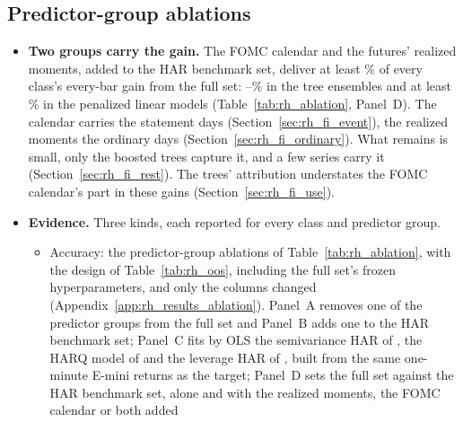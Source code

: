 
\subsection{Predictor-group ablations}
\label{sec:rh_fi}
\label{sec:rh_results_ablation}
\ifdefined\rhfipNOrigins\else\fi
\ifdefined\rhabLgbmFullAllPct\else\fi
\ifdefined\rhcxWMain\else\fi
\ifdefined\rhchNEventDays\else\fi
\ifdefined\rhfaReading\else\fi
\ifdefined\rhbyLXgbReading\else\fi
\ifdefined\rhbyFXgbReading\else\fi
\begin{itemize}
\item \textbf{Two groups carry the gain.} The FOMC calendar and the futures' realized moments, added to the HAR
  benchmark set, deliver at least \rhabBaseShareMin\% of every class's every-bar gain from the full set:
  \rhabBaseShareTreeMin--\rhabBaseShareTreeMax\% in the tree ensembles and at least \rhabBaseShareLinMin\% in the
  penalized linear models (Table~\ref{tab:rh_ablation}, Panel~D). The calendar carries the statement days
  (Section~\ref{sec:rh_fi_event}), the realized moments the ordinary days (Section~\ref{sec:rh_fi_ordinary}). What
  remains is small, only the boosted trees capture it, and a few series carry it (Section~\ref{sec:rh_fi_rest}). The
  trees' attribution understates the FOMC calendar's part in these gains (Section~\ref{sec:rh_fi_use}).
\item \textbf{Evidence.} Three kinds, each reported for every class and predictor group.
  \begin{itemize}
  \item Accuracy: the predictor-group ablations of Table~\ref{tab:rh_ablation}, with the design of
    Table~\ref{tab:rh_oos}, including the full set's frozen hyperparameters, and only the columns changed
    (Appendix~\ref{app:rh_results_ablation}). Panel~A removes one of the \rhfiNBuckets{} predictor groups from the full
    set and Panel~B adds one to the HAR benchmark set; Panel~C fits by OLS the semivariance HAR of
    \citet{PattonSheppard2015}, the HARQ model of \citet{BollerslevPattonQuaedvlieg2016} and the leverage HAR of
    \citet{CorsiReno2012}, built from the same one-minute E-mini returns as the target; Panel~D sets the full set
    against the HAR benchmark set, alone and with the realized moments, the FOMC calendar or both added

\end{itemize}
\end{itemize}
